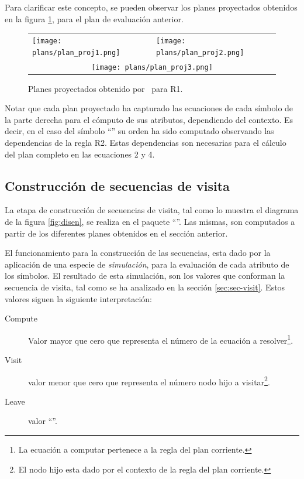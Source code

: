 Para clarificar este concepto, se pueden observar los planes proyectados obtenidos en la figura \ref{fig:plan_project}, para el plan de evaluación anterior.

\begin{figure}[!ht]\centering
\begin{tabular}{l l}
\texttt{[image: plans/plan\_proj1.png]} &
\texttt{[image: plans/plan\_proj2.png]}\\ 
\multicolumn{2}{c}{\texttt{[image: plans/plan\_proj3.png]}}\\
\end{tabular}
\caption{\label{fig:plan_project}Planes proyectados obtenido por \maggen\ para R1.}
\end{figure}

Notar que cada plan proyectado ha capturado las ecuaciones de cada símbolo de la parte derecha para el cómputo de sus atributos, dependiendo del contexto. Es decir, en el caso del símbolo ``'' su orden ha sido computado observando las dependencias de la regla R2. Estas dependencias son necesarias para el cálculo del plan completo en las ecuaciones 2 y 4. 

\subsection{Construcción de secuencias de visita}
\label{sec:constseqvisit}

La etapa de construcción de secuencias de visita, tal como lo muestra el diagrama de la figura \ref{fig:disen}, se realiza en el paquete ``''. Las mismas, son computados a partir de los diferentes planes obtenidos en el sección anterior.

El funcionamiento para la construcción de las secuencias, esta dado por la aplicación de una especie de \textit{simulación}, para la evaluación de cada atributo de los símbolos. El resultado de esta simulación, son los valores que conforman la secuencia de visita, tal como se ha analizado en la sección \ref{sec:sec-visit}. Estos valores siguen la siguiente interpretación: 

\begin{description}
\item [Compute] Valor mayor que cero que representa el número de la ecuación a resolver\footnote{La ecuación a computar pertenece a la regla del plan corriente.}.
\item [Visit] valor menor que cero que representa el número nodo hijo a visitar\footnote{El nodo hijo esta dado por el contexto de la regla del plan corriente.}.
\item [Leave] valor ``''.
\end{description}

